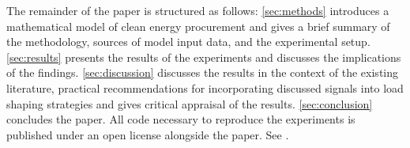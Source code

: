 
The remainder of the paper is structured as follows: \cref{sec:methods} introduces a mathematical model of clean energy procurement and gives a brief summary of the methodology, sources of model input data, and the experimental setup. \cref{sec:results} presents the results of the experiments and discusses the implications of the findings. \cref{sec:discussion} discusses the results in the context of the existing literature, practical recommendations for incorporating discussed signals into load shaping strategies and gives critical appraisal of the results. \cref{sec:conclusion} concludes the paper. All code necessary to reproduce the experiments is published under an open license alongside the paper. See .

